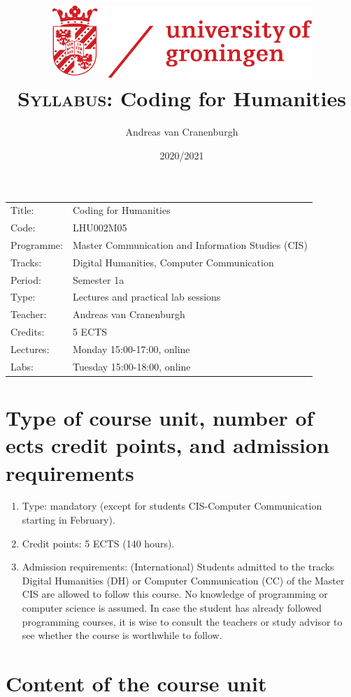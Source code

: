\documentclass[a4paper,12pt]{article}
\title{
    \includegraphics{rug}\\
    \textsc{Syllabus:} Coding for Humanities}
\author{Andreas van Cranenburgh}
\date{2020/2021}
\begin{document}
\maketitle
\thispagestyle{empty}
\pagestyle{empty}


\begin{tabular}{l p{} }
    Title:      & Coding for Humanities \\
    Code:       & LHU002M05 \\
    Programme:  & Master Communication and Information Studies (CIS) \\
    Tracks:     & Digital Humanities, Computer Communication \\
    Period:     & Semester 1a \\
    Type:       & Lectures and practical lab sessions \\
    Teacher:    & Andreas van Cranenburgh \\
    Credits:    & 5 ECTS \\
    Lectures:   & Monday 15:00-17:00, online \\
    Labs:       & Tuesday 15:00-18:00, online \\
\end{tabular}



\section{Type of course unit, number of ects credit points,
        and admission requirements}
\begin{enumerate}[label={(\alph*)}]
    \item Type: mandatory (except for students CIS-Computer Communication
        starting in February).
    \item Credit points: 5 ECTS (140 hours).
    \item Admission requirements: (International) Students admitted to the
        tracks Digital Humanities (DH) or Computer Communication (CC) of the
        Master CIS are allowed to follow this course. No knowledge of
        programming or computer science is assumed. In case the student has
        already followed programming courses, it is wise to consult the
        teachers or study advisor to see whether the course is worthwhile to
        follow.
\end{enumerate}

\section{Content of the course unit}
\end{document}
